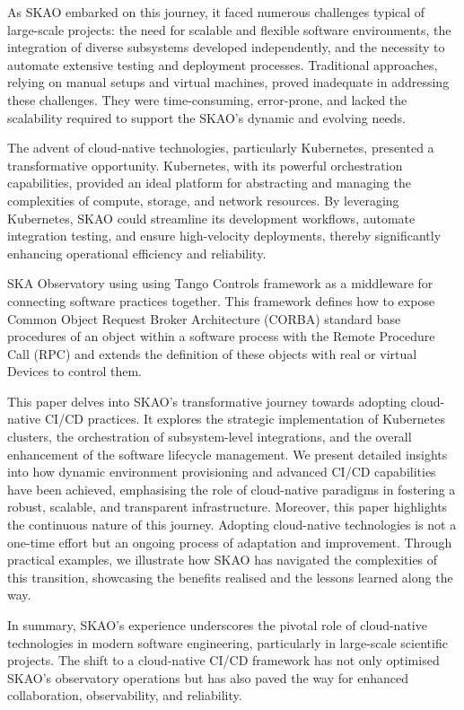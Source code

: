 \documentclass[a4paper]{spie}  %
\begin{document}
As SKAO embarked on this journey, it faced numerous challenges typical of large-scale projects: the need for scalable and flexible software environments, the integration of diverse subsystems developed independently, and the necessity to automate extensive testing and deployment processes. Traditional approaches, relying on manual setups and virtual machines, proved inadequate in addressing these challenges. They were time-consuming, error-prone, and lacked the scalability required to support the SKAO's dynamic and evolving needs.

The advent of cloud-native technologies, particularly Kubernetes, presented a transformative opportunity. Kubernetes, with its powerful orchestration capabilities, provided an ideal platform for abstracting and managing the complexities of compute, storage, and network resources. By leveraging Kubernetes, SKAO could streamline its development workflows, automate integration testing, and ensure high-velocity deployments, thereby significantly enhancing operational efficiency and reliability. 

SKA Observatory using using Tango Controls framework \cite{controls_tango_home_2024}  as a middleware for connecting software practices together. This framework defines how to expose Common Object Request Broker Architecture (CORBA) standard base procedures of an object within a software process with the Remote Procedure Call (RPC) and extends the definition of these objects with real or virtual Devices to control them. 

This paper delves into SKAO's transformative journey towards adopting cloud-native CI/CD practices. It explores the strategic implementation of Kubernetes clusters, the orchestration of subsystem-level integrations, and the overall enhancement of the software lifecycle management. We present detailed insights into how dynamic environment provisioning and advanced CI/CD capabilities have been achieved, emphasising the role of cloud-native paradigms in fostering a robust, scalable, and transparent infrastructure. Moreover, this paper highlights the continuous nature of this journey. Adopting cloud-native technologies is not a one-time effort but an ongoing process of adaptation and improvement. Through practical examples, we illustrate how SKAO has navigated the complexities of this transition, showcasing the benefits realised and the lessons learned along the way.

In summary, SKAO's experience underscores the pivotal role of cloud-native technologies in modern software engineering, particularly in large-scale scientific projects. The shift to a cloud-native CI/CD framework has not only optimised SKAO's observatory operations but has also paved the way for enhanced collaboration, observability, and reliability. 
\end{document}
